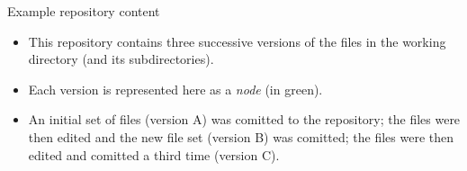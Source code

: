 \documentclass[usenames,dvipsnames]{beamer}
\begin{document}
\begin{frame}{Example repository content}
  \begin{figure}
    \begin{center}
    \end{center}
  \end{figure}
  \begin{block}{}
    \begin{itemize}
      \item{This repository contains three successive versions of the files in the working directory (and its subdirectories).}
      \item{Each version is represented here as a \textit{node} (in green).}
      \item{An initial set of files (version A) was comitted to the repository; the files were then edited and the new file set (version B) was comitted; the files were then edited and comitted a third time (version C).}
    \end{itemize}
  \end{block}
\end{frame}
\end{document}
